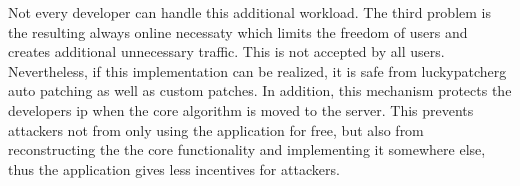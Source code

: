 Not every developer can handle this additional workload.
The third problem is the resulting always online necessaty which limits the freedom of users and creates additional unnecessary traffic.
This is not accepted by all users.
\newline
Nevertheless, if this implementation can be realized, it is safe from \gls{luckypatcherg} auto patching as well as custom patches.
In addition, this mechanism protects the developers \gls{ip} when the core algorithm is moved to the server.
This prevents attackers not from only using the application for free, but also from reconstructing the the core functionality and implementing it somewhere else, thus the application gives less incentives for attackers.
